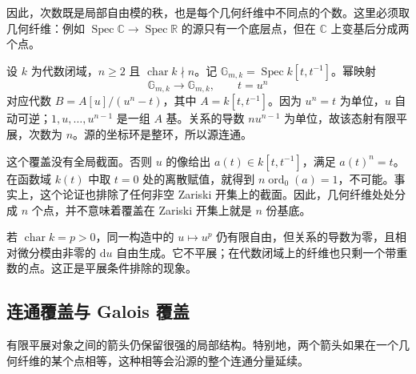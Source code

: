 因此，次数既是局部自由模的秩，也是每个几何纤维中不同点的个数。这里必须取几何纤维：例如 \(\operatorname{Spec}\mathbb C\rightarrow\operatorname{Spec}\mathbb R\) 的源只有一个底层点，但在 \(\mathbb C\) 上变基后分成两个点。

\begin{example}\label{b3:exm:I-power-cover}
	设 \(k\) 为代数闭域，\(n\ge2\) 且 \(\operatorname{char}k\nmid n\)。记 \(\mathbb G_{m,k}=\operatorname{Spec}k[t,t^{-1}]\)。幂映射
	\[
		\mathbb G_{m,k}\longrightarrow\mathbb G_{m,k},\qquad t=u^n
	\]
	对应代数 \(B=A[u]/(u^n-t)\)，其中 \(A=k[t,t^{-1}]\)。因为 \(u^n=t\) 为单位，\(u\) 自动可逆；\(1,u,\ldots,u^{n-1}\) 是一组 \(A\) 基。关系的导数 \(nu^{n-1}\) 为单位，故该态射有限平展，次数为 \(n\)。源的坐标环是整环，所以源连通。

	\ProseParagraphBreak
	这个覆盖没有全局截面。否则 \(u\) 的像给出 \(a(t)\in k[t,t^{-1}]\)，满足 \(a(t)^n=t\)。在函数域 \(k(t)\) 中取 \(t=0\) 处的离散赋值，就得到 \(n\operatorname{ord}_0(a)=1\)，不可能。事实上，这个论证也排除了任何非空 Zariski 开集上的截面。因此，几何纤维处处分成 \(n\) 个点，并不意味着覆盖在 Zariski 开集上就是 \(n\) 份基底。
\end{example}

若 \(\operatorname{char}k=p>0\)，同一构造中的 \(u\mapsto u^p\) 仍有限自由，但关系的导数为零，且相对微分模由非零的 \(\mathrm du\) 自由生成。它不平展；在代数闭域上的纤维也只剩一个带重数的点。这正是平展条件排除的现象。

\subsection{连通覆盖与 Galois 覆盖}
\label{b3:subsec:I01:02}

有限平展对象之间的箭头仍保留很强的局部结构。特别地，两个箭头如果在一个几何纤维的某个点相等，这种相等会沿源的整个连通分量延续。

